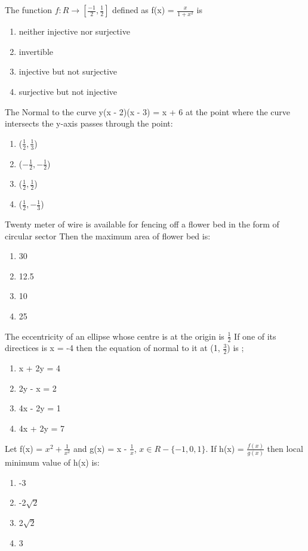 \item The function $f: R \to [\frac{-1}{2}, \frac{1}{2}]$ defined as f(x) = $\frac{x}{1 + x^2}$ is
\begin{enumerate}
\item neither injective nor surjective 
\item invertible
\item injective but not surjective 
\item surjective but not injective
\end{enumerate}

\item The Normal to the curve y(x - 2)(x - 3) = x + 6 at the point where the curve intersects the y-axis passes through the point:
\begin{enumerate}
\item ($\frac{1}{2}, \frac{1}{3}$)
\item ($-\frac{1}{2}, -\frac{1}{2}$)
\item ($\frac{1}{2}, \frac{1}{2}$)
\item ($\frac{1}{2}, -\frac{1}{3}$)
\end{enumerate}

\item Twenty meter of wire is available for fencing off a flower bed in the form of circular sector Then the maximum area of flower bed is:
\begin{enumerate}
\item 30
\item 12.5
\item 10
\item 25
\end{enumerate}

\item The eccentricity of an ellipse whose centre is at the origin is $\frac{1}{2}$ If one of its directices is x = -4 then the equation of normal to it at (1, $\frac{3}{2}$) is ;
\begin{enumerate}
\item x + 2y = 4
\item 2y - x = 2
\item 4x - 2y = 1
\item 4x + 2y = 7
\end{enumerate}

\item Let f(x) = $x^2 + \frac{1}{x^2}$ and g(x) = x - $\frac{1}{x}$, $x \in R-\{-1, 0, 1\}$. If h(x) = $\frac{f(x)}{g(x)}$ then local minimum value of h(x) is:
\begin{enumerate}
\item -3
\item -2$\sqrt{2}$
\item 2$\sqrt{2}$
\item 3
\end{enumerate}

